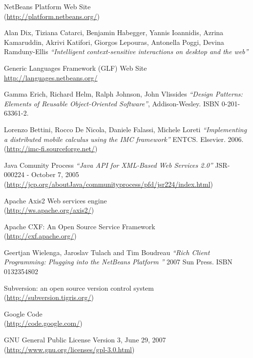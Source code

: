 \begin{thebibliography}{99}
 NetBeans Platform Web Site \\
(\href{http://platform.netbeans.org/}{http://platform.netbeans.org/})

 Alan Dix, Tiziana Catarci, Benjamin Habegger,
Yannis Ioannidis, Azrina Kamaruddin, Akrivi Katifori, Giorgos Lepouras, Antonella Poggi, Devina Ramduny-Ellis
\emph{``Intelligent context-sensitive interactions on desktop and the web''}

 Generic Languages Framework (GLF) Web Site \\
\href{http://languages.netbeans.org/}{http://languages.netbeans.org/}

 Gamma Erich, Richard Helm, Ralph Johnson, John Vlissides
\emph{``Design Patterns: Elements of Reusable Object-Oriented Software''},
Addison-Wesley. ISBN 0-201-63361-2.

 Lorenzo Bettini, Rocco De Nicola, Daniele Falassi, Michele Loreti
\emph{``Implementing a distributed mobile calculus using the IMC framework''}
ENTCS. Elsevier. 2006.\\
(\href{http://imc-fi.sourceforge.net/}{http://imc-fi.sourceforge.net/})

 Java Comunity Process \emph{``Java API for XML-Based Web
Services 2.0''} JSR-000224 - October 7, 2005\\
(\href{http://jcp.org/aboutJava/communityprocess/pfd/jsr224/index.html}{http://jcp.org/aboutJava/communityprocess/pfd/jsr224/index.html})

 Apache Axis2 Web services engine \\
(\href{http://ws.apache.org/axis2/}{http://ws.apache.org/axis2/})

 Apache CXF: An Open Source Service Framework \\
(\href{http://cxf.apache.org/}{http://cxf.apache.org/})

 Geertjan Wielenga, Jaroslav Tulach and Tim Boudreau
\emph{``Rich Client Programming: Plugging into the NetBeans Platform ''} 2007
Sun Press. ISBN 0132354802

 Subversion: an open source version control system \\
(\href{http://subversion.tigris.org/}{http://subversion.tigris.org/})

 Google Code \\
(\href{http://code.google.com/}{http://code.google.com/})

 GNU General Public License Version 3, June 29, 2007\\ 
(\href{http://www.gnu.org/licenses/gpl-3.0.html}{http://www.gnu.org/licenses/gpl-3.0.html})

\end{thebibliography} 